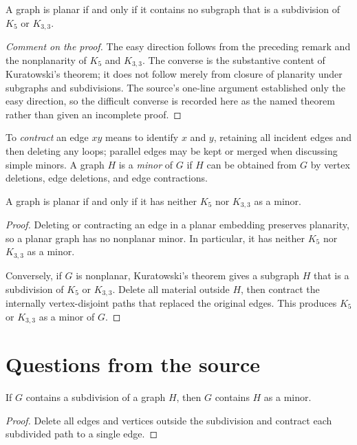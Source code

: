 \begin{notetheorem}
A graph is planar if and only if it contains no subgraph that is a subdivision
of $K_5$ or $K_{3,3}$.
\end{notetheorem}
\begin{proof}[Comment on the proof]
The easy direction follows from the preceding remark and the nonplanarity of
$K_5$ and $K_{3,3}$.  The converse is the substantive content of
Kuratowski's theorem; it does not follow merely from closure of planarity
under subgraphs and subdivisions.  The source's one-line argument established
only the easy direction, so the difficult converse is recorded here as the
named theorem rather than given an incomplete proof.
\end{proof}
\begin{notedefinition}
To \emph{contract} an edge $xy$ means to identify $x$ and $y$, retaining all
incident edges and then deleting any loops; parallel edges may be kept or
merged when discussing simple minors.  A graph $H$ is a \emph{minor} of $G$
if $H$ can be obtained from $G$ by vertex deletions, edge deletions, and edge
contractions.
\end{notedefinition}

\begin{notetheorem}
A graph is planar if and only if it has neither $K_5$ nor $K_{3,3}$ as a
minor.
\end{notetheorem}
\begin{proof}
Deleting or contracting an edge in a planar embedding preserves planarity,
so a planar graph has no nonplanar minor.  In particular, it has neither
$K_5$ nor $K_{3,3}$ as a minor.

Conversely, if $G$ is nonplanar, Kuratowski's theorem gives a subgraph $H$
that is a subdivision of $K_5$ or $K_{3,3}$.  Delete all material outside
$H$, then contract the internally vertex-disjoint paths that replaced the
original edges.  This produces $K_5$ or $K_{3,3}$ as a minor of $G$.
\end{proof}
\section{Questions from the source}

\begin{noteexercise}
If $G$ contains a subdivision of a graph $H$, then $G$ contains $H$ as a
minor.
\end{noteexercise}
\begin{proof}
Delete all edges and vertices outside the subdivision and contract each
subdivided path to a single edge.
\end{proof}


